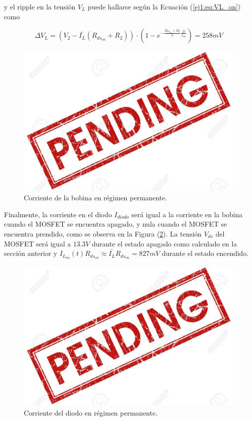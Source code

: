 y el ripple en la tensión $V_L$ puede hallarse según la Ecuación (\ref{ej1:eq:VL_on}) como

\begin{equation}
\Delta V_L = \left( V_2 - \bar{I_L} (R_{ds_{on}}+R_2) \right) \cdot (1-e^{-\frac{R_{ds_{on}} + R_2}{L}\frac{D}{f_{sw}}}) = 258mV
\end{equation}

\begin{figure}[H]
	\centering
	\includegraphics[width=0.8\linewidth]{ImagenesEjercicio-1/pend}
	\caption{Corriente de la bobina en régimen permanente.}
	\label{ej1:fig:corriente_bobina}
\end{figure}

Finalmente, la corriente en el diodo $I_{diodo}$ será igual a la corriente en la bobina cuando el MOSFET se encuentra apagado, y nula cuando el MOSFET se encuentra prendido, como se observa en la Figura (\ref{ej1:fig:corriente_diodo}). La tensión $V_{ds}$ del MOSFET será igual a $13.3V$ durante el estado apagado como calculado en la sección anterior y $I_{L_{on}}(t)R_{ds_{on}} \approx \bar{I_L}R_{ds_{on}} = 827mV$ durante el estado encendido.

\begin{figure}[H]
	\centering
	\includegraphics[width=0.8\linewidth]{ImagenesEjercicio-1/pend}
	\caption{Corriente del diodo en régimen permanente.}
	\label{ej1:fig:corriente_diodo}
\end{figure}

